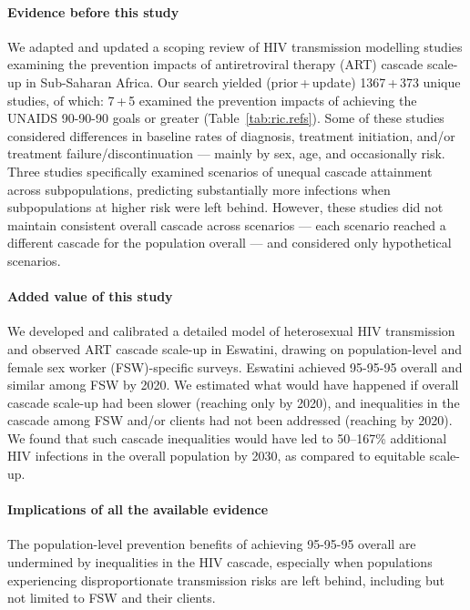 \newcommand{\pu}[2]{#1\,+\,#2}
\begin{ric}[b]
  \paragraph{Evidence before this study}
  We adapted and updated a scoping review of HIV transmission modelling studies examining
  the prevention impacts of antiretroviral therapy (ART) cascade scale-up in Sub-Saharan Africa.
  Our search yielded (\pu{prior}{update}) \pu{1367}{373} unique studies, of which:
  \pu{7}{5} examined the prevention impacts of achieving
  the UNAIDS 90-90-90 goals or greater (Table~\ref{tab:ric.refs}).
  Some of these studies considered differences in baseline rates of
  diagnosis, treatment initiation, and/or treatment failure/discontinuation
  --- mainly by sex, age, and occasionally risk.
  Three studies specifically examined scenarios of unequal cascade attainment across subpopulations,
  predicting substantially more infections when subpopulations at higher risk were left behind.
    However, these studies did not maintain consistent overall cascade across scenarios
  --- \ie each scenario reached a different cascade for the population overall ---
  and considered only hypothetical scenarios.
  \paragraph{Added value of this study}
  We developed and calibrated a detailed model of heterosexual HIV transmission
  and observed ART cascade scale-up in Eswatini,
  drawing on population-level and female sex worker (FSW)-specific surveys.
  Eswatini achieved 95-95-95 overall and similar among FSW by 2020.
  We estimated what would have happened if
  overall cascade scale-up had been slower
  (reaching only \casmd by 2020), and
  inequalities in the cascade among FSW and/or clients had not been addressed
  (reaching \caslo by 2020).
  We found that such cascade inequalities
  would have led to 50--167\% additional HIV infections in the overall population by 2030,
  as compared to equitable scale-up.
  \paragraph{Implications of all the available evidence}
  The population-level prevention benefits of achieving 95-95-95 overall
  are undermined by inequalities in the HIV cascade, especially when
  populations experiencing disproportionate transmission risks are left behind,
  including but not limited to FSW and their clients.
\end{ric}
